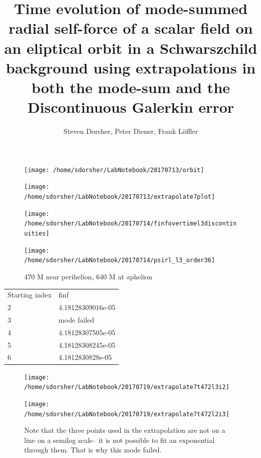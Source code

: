\documentclass{article}
\begin{document}
\title{Time evolution of mode-summed radial self-force of a scalar field on an eliptical orbit in a Schwarszchild background using extrapolations in both the mode-sum and the Discontinuous Galerkin error}
\author{Steven Dorsher, Peter Diener, Frank L\"{o}ffler}
\maketitle



\begin{figure}
\texttt{[image: /home/sdorsher/LabNotebook/20170713/orbit]}
\end{figure}


\begin{figure}
\texttt{[image: /home/sdorsher/LabNotebook/20170713/extrapolate7plot]}
\end{figure}

\begin{figure}
  \texttt{[image: /home/sdorsher/LabNotebook/20170714/finfovertimel3discontinuities]}
\end{figure}


\begin{figure}
  \texttt{[image: /home/sdorsher/LabNotebook/20170714/psirl\_l3\_order36]}
  \caption{470 M near perihelion, 640 M at aphelion}
\end{figure}



\begin{table}
\begin{tabular}{ll}
Starting index & finf\\
2 & 4.18128309016e-05\\
3 & mode failed\\
4 & 4.18128307505e-05\\
5 & 4.18128308245e-05\\
6 & 4.1812830828e-05\\
\end{tabular}
\end{table}


\begin{figure}
  \texttt{[image: /home/sdorsher/LabNotebook/20170719/extrapolate7t472l3i2]}
\end{figure}

\begin{figure}
  \texttt{[image: /home/sdorsher/LabNotebook/20170719/extrapolate7t472l2i3]}
  \caption{Note that the three points used in the extrapolation are not on a line on a semilog scale-- it is not possible to fit an exponential through them. That is why this mode failed.}
\end{figure}
\end{document}
